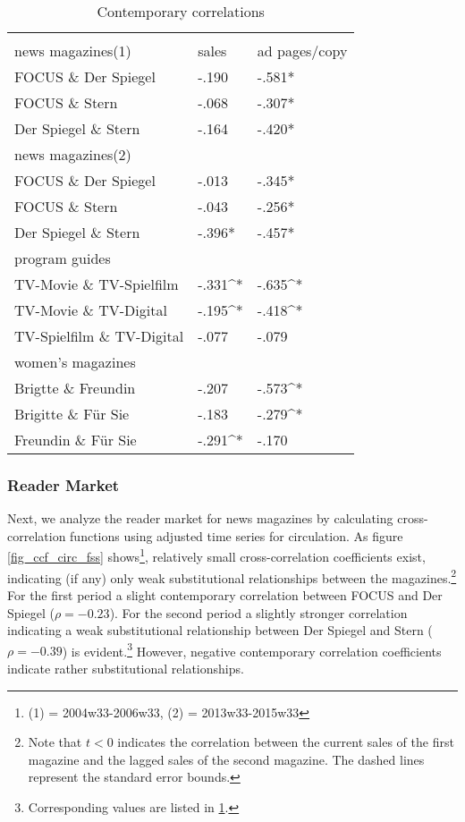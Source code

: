 \documentclass[12pt,a4paper]{scrreprt}
\begin{document}
\begin{table}[!htbp] \centering
	\caption{Contemporary correlations}
	\label{tab_CCF}
\begin{tabular}{@{\extracolsep{5pt}} lll}
\\[-1.8ex]\hline 
\hline \\[-1.8ex]
	news magazines(1) & sales & ad pages/copy \\
	\hline
	FOCUS \& Der Spiegel & -.190 & -.581{*} \\
	FOCUS \& Stern & -.068 & -.307{*} \\
	Der Spiegel \& Stern & -.164 & -.420{*} \\
	\hline
	news magazines(2) & & \\
	\hline
	FOCUS \& Der Spiegel & -.013 & -.345{*} \\
	FOCUS \& Stern & -.043 & -.256{*} \\
	Der Spiegel \& Stern & -.396{*} & -.457{*} \\
	\hline
	program guides & & \  \\ 
	\hline
	TV-Movie \& TV-Spielfilm & -.331^{*} & -.635^{*} \\
	TV-Movie \& TV-Digital & -.195^{*} & -.418^{*} \\
	TV-Spielfilm \& TV-Digital & -.077 & -.079 \\ 
	\hline
	women's magazines &  & \  \\ 
	\hline
	Brigtte \& Freundin & -.207 & -.573^{*} \\ 
	Brigitte \& Für Sie & -.183 & -.279^{*} \\ 
	Freundin \& Für Sie & -.291^{*} & -.170 \\ \hline
\end{tabular}
	\end{table}


\subsubsection{Reader Market}

Next, we analyze the reader market for news magazines by calculating cross-correlation functions using adjusted time series for circulation. As figure \ref{fig_ccf_circ_fss} shows\footnote{(1) = 2004w33-2006w33, (2) = 2013w33-2015w33}, relatively small cross-correlation coefficients exist, indicating (if any) only weak substitutional relationships between the magazines.\footnote{Note that $t<0$ indicates the correlation between the current sales of the first magazine and the lagged sales of the second magazine. The dashed lines represent the standard error bounds.} For the first period a slight contemporary correlation between FOCUS and Der Spiegel ($\rho=-0.23$). For the second period a slightly stronger correlation indicating a weak substitutional relationship between Der Spiegel and Stern ($\rho=-0.39$) is evident.\footnote{Corresponding values are listed in \ref{tab_CCF}.}  However, negative contemporary correlation coefficients indicate rather substitutional relationships.
\end{document}
